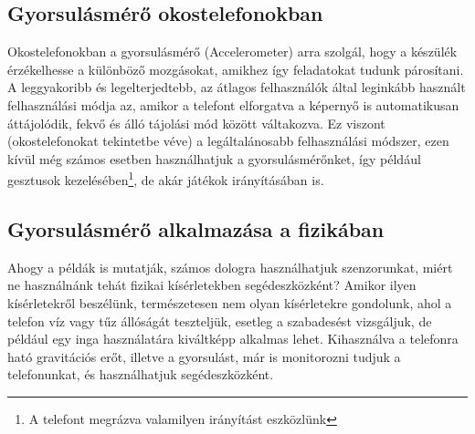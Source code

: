 \documentclass{thesis-ekf}
\theoremstyle{definition}
\theoremstyle{remark}
\begin{document}
\subsection{Gyorsulásmérő okostelefonokban}
Okostelefonokban a gyorsulásmérő (Accelerometer) arra szolgál, hogy a készülék érzékelhesse a különböző mozgásokat, amikhez így feladatokat tudunk párosítani. A leggyakoribb és legelterjedtebb, az átlagos felhasználók által leginkább használt felhasználási módja az, amikor a telefont elforgatva a képernyő is automatikusan áttájolódik, fekvő és álló tájolási mód között váltakozva. Ez viszont (okostelefonokat tekintetbe véve) a legáltalánosabb felhasználási módszer, ezen kívül még számos esetben használhatjuk a gyorsulásmérőnket, így például gesztusok kezelésében\footnote{A telefont megrázva valamilyen irányítást eszközlünk}, de akár játékok irányításában is.
\subsection{Gyorsulásmérő alkalmazása a fizikában}
Ahogy a példák is mutatják, számos dologra használhatjuk szenzorunkat, miért ne használnánk tehát fizikai kísérletekben segédeszközként? Amikor ilyen kísérletekről beszélünk, természetesen nem olyan kísérletekre gondolunk, ahol a telefon víz vagy tűz állóságát teszteljük, esetleg a szabadesést vizsgáljuk, de például egy inga használatára kiváltképp alkalmas lehet. Kihasználva a telefonra ható gravitációs erőt, illetve a gyorsulást, már is monitorozni tudjuk a telefonunkat, és használhatjuk segédeszközként.
\end{document}
